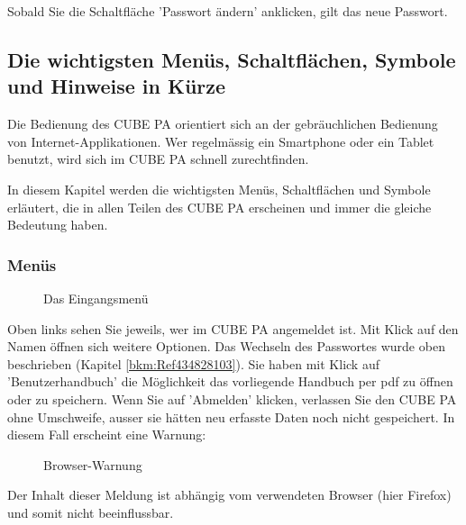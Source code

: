 Sobald Sie die Schaltfläche 'Passwort ändern' anklicken, gilt das neue Passwort.

\subsection{Die wichtigsten Menüs, Schaltflächen, Symbole und Hinweise in Kürze}

Die Bedienung des CUBE PA orientiert sich an der gebräuchlichen Bedienung von Internet-Applikationen. Wer regelmässig ein Smartphone oder ein Tablet benutzt, wird sich im CUBE PA schnell zurechtfinden.

\vspace{\baselineskip}

In diesem Kapitel werden die wichtigsten Menüs, Schaltflächen und Symbole erläutert, die in allen Teilen des CUBE PA erscheinen und immer die gleiche Bedeutung haben.

\pagebreak

\subsubsection{Menüs}

\begin{figure}[H]
\caption{Das Eingangsmenü}
\end{figure}


Oben links sehen Sie jeweils, wer im CUBE PA angemeldet ist. Mit Klick auf den Namen öffnen sich weitere Optionen. Das Wechseln des Passwortes wurde oben beschrieben (Kapitel \ref{bkm:Ref434828103}). Sie haben mit Klick auf 'Benutzerhandbuch' die Möglichkeit das vorliegende Handbuch per pdf zu öffnen oder zu speichern. Wenn Sie auf 'Abmelden' klicken, verlassen Sie den CUBE PA ohne Umschweife, ausser sie hätten neu erfasste Daten noch nicht gespeichert. In diesem Fall erscheint eine Warnung:

\begin{figure}[H]
\caption{Browser-Warnung}
\end{figure}
\begin{small}
Der Inhalt dieser Meldung ist abhängig vom verwendeten Browser (hier Firefox) und somit nicht beeinflussbar.
\end{small}

